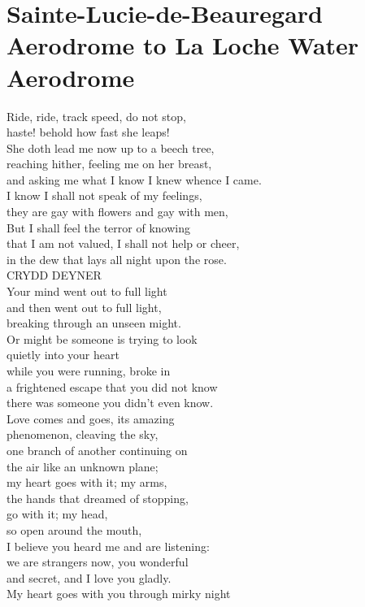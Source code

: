 \documentclass[smalldemyvopaper,11pt,twoside,onecolumn,openright,extrafontsizes]{memoir}
\begin{document}
\chapter{Sainte-Lucie-de-Beauregard Aerodrome to La Loche Water Aerodrome}
Ride, ride, track speed, do not stop,
\\haste! behold how fast she leaps!
\\She doth lead me now up to a beech tree,
\\reaching hither, feeling me on her breast,
\\and asking me what I know I knew whence I came.
\\I know I shall not speak of my feelings,
\\they are gay with flowers and gay with men,
\\But I shall feel the terror of knowing
\\that I am not valued, I shall not help or cheer,
\\in the dew that lays all night upon the rose.
\\CRYDD DEYNER
\\Your mind went out to full light
\\and then went out to full light,
\\breaking through an unseen might.
\\Or might be someone is trying to look
\\quietly into your heart
\\while you were running, broke in
\\a frightened escape that you did not know
\\there was someone you didn't even know.
\\Love comes and goes, its amazing
\\phenomenon, cleaving the sky,
\\one branch of another continuing on
\\the air like an unknown plane;
\\my heart goes with it; my arms,
\\the hands that dreamed of stopping,
\\go with it; my head,
\\so open around the mouth,
\\I believe you heard me and are listening:
\\we are strangers now, you wonderful
\\and secret, and I love you gladly.
\\My heart goes with you through mirky night
\end{document}
